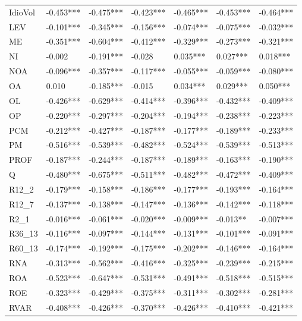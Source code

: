 \begin{tabular}{lllllll}
IdioVol &  -0.453*** &  -0.475*** &  -0.423*** &  -0.465*** &  -0.453*** &  -0.464*** \\
LEV     &  -0.101*** &  -0.345*** &  -0.156*** &  -0.074*** &  -0.075*** &  -0.032*** \\
ME      &  -0.351*** &  -0.604*** &  -0.412*** &  -0.329*** &  -0.273*** &  -0.321*** \\
NI      &     -0.002 &  -0.191*** &     -0.028 &   0.035*** &   0.027*** &   0.018*** \\
NOA     &  -0.096*** &  -0.357*** &  -0.117*** &  -0.055*** &  -0.059*** &  -0.080*** \\
OA      &      0.010 &  -0.185*** &     -0.015 &   0.034*** &   0.029*** &   0.050*** \\
OL      &  -0.426*** &  -0.629*** &  -0.414*** &  -0.396*** &  -0.432*** &  -0.409*** \\
OP      &  -0.220*** &  -0.297*** &  -0.204*** &  -0.194*** &  -0.238*** &  -0.223*** \\
PCM     &  -0.212*** &  -0.427*** &  -0.187*** &  -0.177*** &  -0.189*** &  -0.233*** \\
PM      &  -0.516*** &  -0.539*** &  -0.482*** &  -0.524*** &  -0.539*** &  -0.513*** \\
PROF    &  -0.187*** &  -0.244*** &  -0.187*** &  -0.189*** &  -0.163*** &  -0.190*** \\
Q       &  -0.480*** &  -0.675*** &  -0.511*** &  -0.482*** &  -0.472*** &  -0.409*** \\
R12\_2   &  -0.179*** &  -0.158*** &  -0.186*** &  -0.177*** &  -0.193*** &  -0.164*** \\
R12\_7   &  -0.137*** &  -0.138*** &  -0.147*** &  -0.136*** &  -0.142*** &  -0.118*** \\
R2\_1    &  -0.016*** &  -0.061*** &  -0.020*** &  -0.009*** &   -0.013** &  -0.007*** \\
R36\_13  &  -0.116*** &  -0.097*** &  -0.144*** &  -0.131*** &  -0.101*** &  -0.091*** \\
R60\_13  &  -0.174*** &  -0.192*** &  -0.175*** &  -0.202*** &  -0.146*** &  -0.164*** \\
RNA     &  -0.313*** &  -0.562*** &  -0.416*** &  -0.325*** &  -0.239*** &  -0.215*** \\
ROA     &  -0.523*** &  -0.647*** &  -0.531*** &  -0.491*** &  -0.518*** &  -0.515*** \\
ROE     &  -0.323*** &  -0.429*** &  -0.375*** &  -0.311*** &  -0.302*** &  -0.281*** \\
RVAR    &  -0.408*** &  -0.426*** &  -0.370*** &  -0.426*** &  -0.410*** &  -0.421*** \\

\end{tabular}
